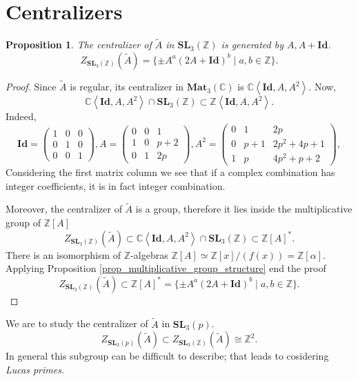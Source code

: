 \documentclass[a4paper]{article}
\newtheorem{Prop}[Thm]{Proposition}
\newcommand{\C}{\mathbb{C}}        %
\newcommand{\Id}{\mathbf{Id}}        %
\newcommand{\SL}{\mathbf{SL}_3(\mathbb{Z})}        %
\newcommand{\Mat}{\mathbf{Mat}_3(\mathbb{C})}        %
\newcommand{\SLp}{\mathbf{SL}_3(p)}        %
\begin{document}
\section{Centralizers}
\begin{Prop}
	\label{proposition_centralizer_in_sl}
The centralizer of $\tilde A$ in $\SL$
is generated by $A, A+\Id$.
$$Z_{\SL}(\tilde A) = \{ \pm A^a (2 A + \Id)^b \mid a, b \in \mathbb{Z} \} .$$ 
\end{Prop}
\begin{proof}
Since $\tilde A$ is regular, its centralizer in $ \Mat $ is $\C \left< \Id, A, A^2 \right> $.
Now, 
\[
\C \left< \Id, A, A^2 \right> \cap \SL 
\subset \mathbb{Z} 
\left< \Id, A, A^2 \right>
.\] 
Indeed,
\begin{equation}
\Id = 
\begin{pmatrix}
1 & 0 & 0 \\
0 & 1 & 0 \\
0 & 0 & 1
\end{pmatrix}, 
A = 
\begin{pmatrix}
0 & 0 & 1 \\
1 & 0 & p+2 \\
0 & 1 & 2p
\end{pmatrix}, 
A^2 = 
\begin{pmatrix}
0 & 1 & 2p \\
0 & p+1 & 2p^2+4p+1 \\
1 & p & 4p^2+p+2
\end{pmatrix}, 
\end{equation}
Considering the first matrix column we see that if a complex combination has integer coefficients, it is in fact integer combination.

Moreover, 
the centralizer of $\tilde A$ is a group, therefore it lies inside the multiplicative group of $\mathbb{Z}[A]$
\[
Z_{\SL}(\tilde A)  \subset 
\C \left< \Id, A, A^2 \right> \cap \SL 
\subset \mathbb{Z}[A]^*
.\] 
There is an isomorphism of $\mathbb{Z}$-algebras $\mathbb{Z}[A] \simeq \mathbb{Z}[x]/(f(x)) = \mathbb{Z}[\alpha]$.
Applying Proposition \ref{prop_multiplicative_group_structure} end the proof
\[
Z_{\SL}(\tilde A) 
\subset \mathbb{Z}[A]^* =\{ \pm A^a (2 A + \Id)^b \mid a, b \in \mathbb{Z} \}.\] 
\end{proof}

We are to study the centralizer of $\tilde A$ in $\SLp$.
\[
Z_{\SLp}(\tilde A) \subset 
Z_{\SL}(\tilde A) \cong \mathbb{Z}^2
.\] 
In general this subgroup can be difficult to describe; 
that leads to cosidering \emph{Lucas primes}.
\end{document}
